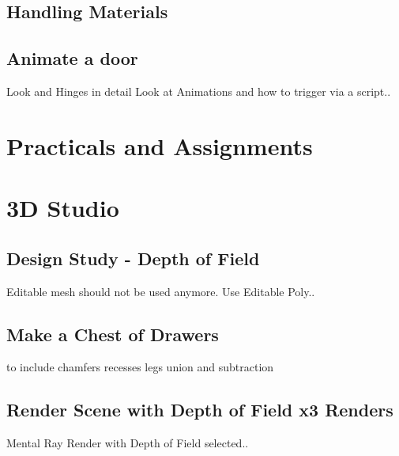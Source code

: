 \subsection{Handling Materials}


\subsection{Animate a door}
Look and Hinges in detail
Look at Animations and how to trigger via a script..


\section{Practicals and Assignments}



\section{3D Studio}

\subsection{Design Study - Depth of Field}



Editable mesh should not be used anymore.  Use Editable Poly..







\newpage

%


\subsection{Make a Chest of Drawers}

to include chamfers
recesses
legs
union and subtraction




\subsection{Render Scene with Depth of Field x3 Renders}
Mental Ray Render with Depth of Field selected..




%
%
\nocite{*}


\newpage

\printindex
\newpage






